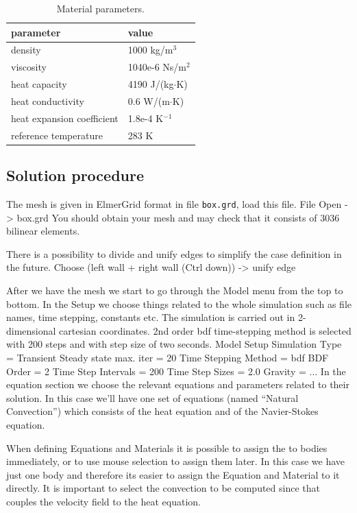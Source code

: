 \begin{table}[h]
\caption{Material parameters.}
\label{tb:matpar}
\begin{center}
\begin{tabular}{ll} \hline
parameter  & value \\ \hline
density & 1000 kg/m$^{3}$ \\
viscosity & 1040e-6 Ns/m$^{2}$ \\
heat capacity & 4190 J/(kg$\cdot$K) \\
heat conductivity & 0.6 W/(m$\cdot$K)       \\
heat expansion coefficient & 1.8e-4 K$^{-1}$      \\ 
reference temperature & 283 K       \\ \hline
\end{tabular}
\end{center}
\end{table}


\subsection*{Solution procedure}

The mesh is given in ElmerGrid format in file \texttt{box.grd}, load this file.
\ttbegin
File 
  Open -> box.grd
\ttend
You should obtain your mesh and may check that it consists of 3036 bilinear elements.

There is a possibility to divide and unify edges to simplify the case definition in the future.
\ttbegin
Choose (left wall + right wall (Ctrl down)) -> unify edge
\ttend

After we have the mesh we start to go through the Model menu from the top to bottom. 
In the Setup we choose things related to the whole simulation such as file names, 
time stepping, constants etc.
The simulation is carried out in 2-dimensional cartesian
coordinates. 2nd order bdf time-stepping method is selected with 200 steps
and with step size of two seconds.
\ttbegin
Model
  Setup 
    Simulation Type = Transient
    Steady state max. iter = 20
    Time Stepping Method = bdf
    BDF Order = 2
    Time Step Intervals = 200
    Time Step Sizes = 2.0
    Gravity = ...
\ttend
In the equation section we choose the relevant equations and parameters related to their solution. 
In this case we'll have one set of equations (named ``Natural Convection'') which consists of the heat equation
and of the Navier-Stokes equation.

When defining Equations and Materials it is possible to assign the to bodies immediately, or to use mouse
selection to assign them later. In this case we have just one body and therefore its easier to assign 
the Equation and Material to it directly.
It is important to select the 
convection to be computed since that couples the velocity field to the heat equation.


